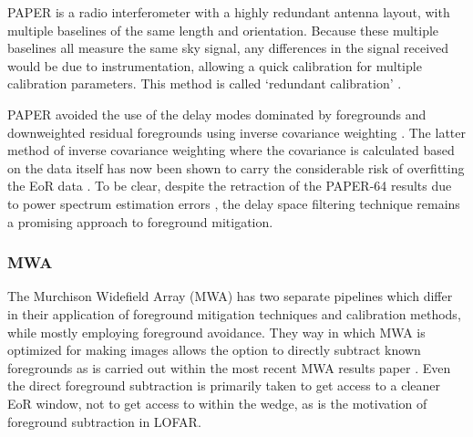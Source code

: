 PAPER is a radio interferometer with a highly redundant antenna layout, with multiple baselines of the same length and orientation. Because these multiple baselines all measure the same sky signal, any differences in the signal received would be due to instrumentation, allowing a quick calibration for multiple calibration parameters. This method is called `redundant calibration' \citep{Ronniy2018AJ....156..285J,Li2018ApJ...863..170L,Dillon2016ApJ...826..181D,Zheng2014MNRAS.445.1084Z,Wieringa1992ExA.....2..203W}. 

PAPER avoided the use of the delay modes dominated by foregrounds and downweighted residual foregrounds using inverse covariance weighting \citet{Ali2015ApJ...809...61A}. The latter method of inverse covariance weighting where the covariance is calculated based on the data itself has now been shown to carry the considerable risk of overfitting the EoR data \cite{Cheng2018ApJ...868...26C}. To be clear, despite the retraction of the PAPER-64 results due to power spectrum estimation errors \cite{Ali2018ApJ...863..201A}, the delay space filtering technique remains a promising approach to foreground mitigation.

\subsubsection{MWA}
The Murchison Widefield Array (MWA) has two separate pipelines which differ in their application of foreground mitigation techniques and calibration methods, while mostly employing foreground avoidance. They way in which MWA is optimized for making images allows the option to directly subtract known foregrounds as is carried out within the most recent MWA results paper \citep{Beardsley2016ApJ...833..102B}. Even the direct foreground subtraction is primarily taken to get access to a cleaner EoR window, not to get access to within the wedge, as is the motivation of foreground subtraction in LOFAR.

